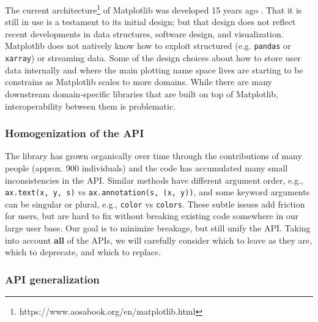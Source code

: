 \documentclass[11pt]{article}  %
\begin{document}
The current
architecture\footnote{https://www.aosabook.org/en/matplotlib.html} of
Matplotlib was developed 15 years ago \cite{Hunter:2007}.  That it is
still in use is a testament to its initial design; but that design
does not reflect recent developments in data structures, software
design, and visualization.  Matplotlib does not natively know how to
exploit structured (e.g. \texttt{pandas} or \texttt{xarray}) or
streaming data.  Some of the design choices about how to store user
data internally and where the main plotting name space lives are
starting to be constrains as Matplotlib scales to more domains.  While
there are many downstream domain-specific libraries that are built on
top of Matplotlib, interoperability between them is problematic.


\subsubsection{Homogenization of the API}

The library has grown organically over time through the contributions
of many people (approx. 900 individuals) and the code has accumulated
many small inconsistencies in the API.  Similar methods have different
argument order, e.g., \texttt{ax.text(x, y, s)} vs
\texttt{ax.annotation(s, (x, y))}, and some keyword arguments can be
singular or plural, e.g., \texttt{color} vs \texttt{colors}.  These
subtle issues add friction for users, but are hard to fix without
breaking existing code somewhere in our large user base.  Our goal is
to minimize breakage, but still unify the API.  Taking into account
\textbf{all} of the APIs, we will carefully consider which to leave as
they are, which to deprecate, and which to replace.

\subsubsection{API generalization}
\end{document}
